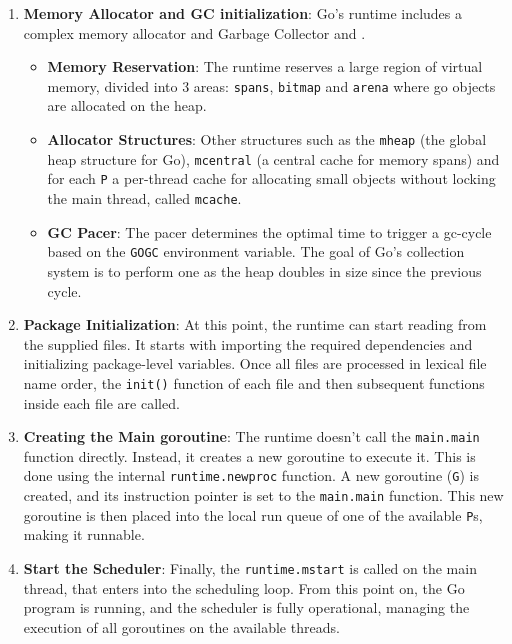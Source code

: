 \begin{enumerate}
    \item \textbf{Memory Allocator and \gls{GC} initialization}: Go's runtime includes a complex memory allocator and Garbage Collector \cite{go:memory-distribution} and \cite{go:memory-internals}.
    \begin{itemize}
        \item \textbf{Memory Reservation}: The runtime reserves a large region of virtual memory, divided into 3 areas: \texttt{spans}, \texttt{bitmap} and \texttt{arena} where go objects are allocated on the heap.
        \item \textbf{Allocator Structures}: Other structures such as the \texttt{mheap} (the global heap structure for Go), \texttt{mcentral} (a central cache for memory spans) and for each \texttt{P} a per-thread cache for allocating small objects without locking the main thread, called \texttt{mcache}.
        \item \textbf{\gls{GC} Pacer}: The pacer determines the optimal time to trigger a \gls{gc-cycle} based on the \texttt{GOGC} environment variable. The goal of Go's collection system is to perform one as the heap doubles in size since the previous cycle.
    \end{itemize}

    \item \textbf{Package Initialization}: At this point, the runtime can start reading from the supplied files. It starts with importing the required dependencies and initializing package-level variables. Once all files are processed in lexical file name order, the \texttt{init()} function of each file and then subsequent functions inside each file are called.

    \item \textbf{Creating the Main \Gls{goroutine}}: The runtime doesn't call the \texttt{main.main} function directly. Instead, it creates a new \gls{goroutine} to execute it. This is done using the internal \texttt{runtime.newproc} function. A new \gls{goroutine} (\texttt{G}) is created, and its instruction pointer is set to the \texttt{main.main} function. This new \gls{goroutine} is then placed into the local run queue of one of the available \texttt{P}s, making it runnable.
        
    \item \textbf{Start the Scheduler}: Finally, the \texttt{runtime.mstart} is called on the main thread, that enters into the scheduling loop. From this point on, the Go program is running, and the scheduler is fully operational, managing the execution of all goroutines on the available threads.
        
\end{enumerate}



